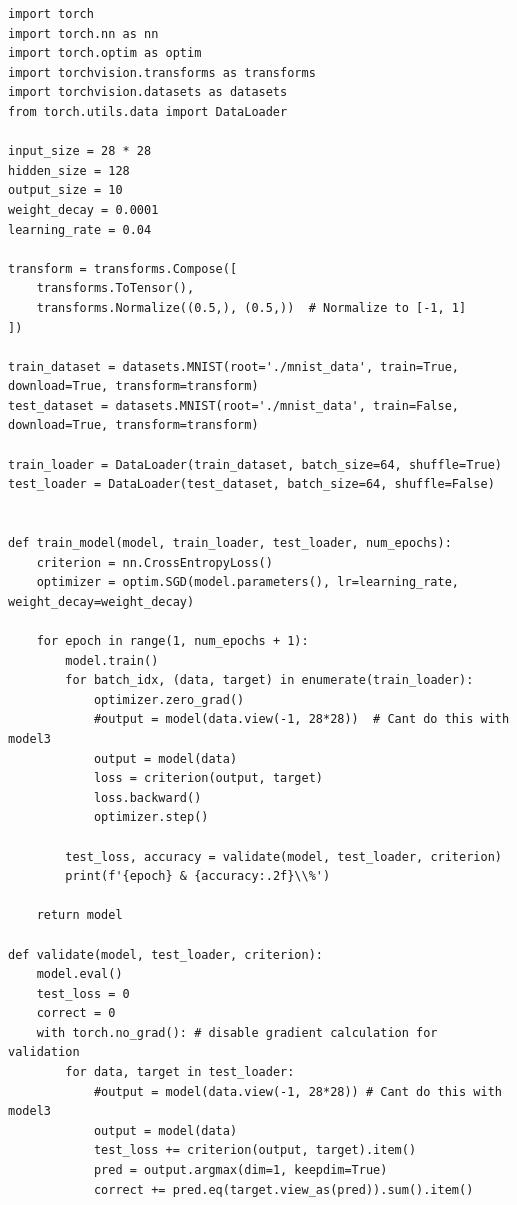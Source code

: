 \documentclass[a4paper]{article}
\begin{document}
\begin{lstlisting}
import torch
import torch.nn as nn
import torch.optim as optim
import torchvision.transforms as transforms
import torchvision.datasets as datasets
from torch.utils.data import DataLoader

input_size = 28 * 28
hidden_size = 128
output_size = 10
weight_decay = 0.0001
learning_rate = 0.04

transform = transforms.Compose([
    transforms.ToTensor(),
    transforms.Normalize((0.5,), (0.5,))  # Normalize to [-1, 1]
])

train_dataset = datasets.MNIST(root='./mnist_data', train=True, download=True, transform=transform)
test_dataset = datasets.MNIST(root='./mnist_data', train=False, download=True, transform=transform)

train_loader = DataLoader(train_dataset, batch_size=64, shuffle=True)
test_loader = DataLoader(test_dataset, batch_size=64, shuffle=False)


def train_model(model, train_loader, test_loader, num_epochs):
    criterion = nn.CrossEntropyLoss()
    optimizer = optim.SGD(model.parameters(), lr=learning_rate, weight_decay=weight_decay)

    for epoch in range(1, num_epochs + 1):
        model.train()
        for batch_idx, (data, target) in enumerate(train_loader):
            optimizer.zero_grad()
            #output = model(data.view(-1, 28*28))  # Cant do this with model3
            output = model(data)
            loss = criterion(output, target)
            loss.backward()
            optimizer.step()
        
        test_loss, accuracy = validate(model, test_loader, criterion)
        print(f'{epoch} & {accuracy:.2f}\\%')
    
    return model

def validate(model, test_loader, criterion):
    model.eval()
    test_loss = 0
    correct = 0
    with torch.no_grad(): # disable gradient calculation for validation
        for data, target in test_loader:
            #output = model(data.view(-1, 28*28)) # Cant do this with model3
            output = model(data)
            test_loss += criterion(output, target).item()
            pred = output.argmax(dim=1, keepdim=True) 
            correct += pred.eq(target.view_as(pred)).sum().item()


\end{lstlisting}
\end{document}
